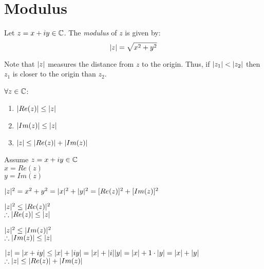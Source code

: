 \documentclass[letterpaper,12pt,fleqn]{article}
\begin{document}
\section*{Modulus}
\begin{definition}
Let $z=x+iy\in\mathbb{C}$. The \emph{modulus} of $z$ is given by:
\[\lvert z\rvert=\sqrt{x^2+y^2}\]
\end{definition}

\begin{figure*}[h]
\setlength{\leftskip}{0.5in}
\end{figure*}

Note that $\lvert z\rvert$ measures the distance from $z$ to the origin. Thus, if
$\lvert z_1\rvert<\lvert z_2\rvert$ then $z_1$ is closer to the origin than $z_2$.

\begin{theorem}
$\forall z\in\mathbb{C}$:
\begin{enumerate}
\item{$\lvert Re(z)\rvert\le\lvert z\rvert$}
\item{$\lvert Im(z)\rvert\le\lvert z\rvert$}
\item{$\lvert z\rvert\le\lvert Re(z)\rvert+\lvert Im(z)\rvert$}
\end{enumerate}
\end{theorem}

\begin{theproof}
  Assume $z=x+iy\in\mathbb{C}$ \\
  $x=Re(z)$ \\
  $y=Im(z)$
  
  $\lvert z\rvert^2=x^2+y^2=\lvert x\rvert^2+\lvert y\rvert^2=[Re(z)]^2+[Im(z)]^2$

  $\lvert z\rvert^2\le\lvert Re(z)\rvert^2$ \\
  $\therefore\lvert Re(z)\rvert\le\lvert z\rvert$

  $\lvert z\rvert^2\le\lvert Im(z)\rvert^2$ \\
  $\therefore\lvert Im(z)\rvert\le\lvert z\rvert$

  $\lvert z\rvert=\lvert x+iy\rvert\le\lvert x\rvert+\lvert iy\rvert=\lvert x\rvert+\lvert i\rvert\lvert y\rvert=
  \lvert x\rvert+1\cdot\lvert y\rvert=\lvert x\rvert+\lvert y\rvert$ \\
  $\therefore\lvert z\rvert\le\lvert Re(z)\rvert+\lvert Im(z)\rvert$
\end{theproof}
\end{document}
